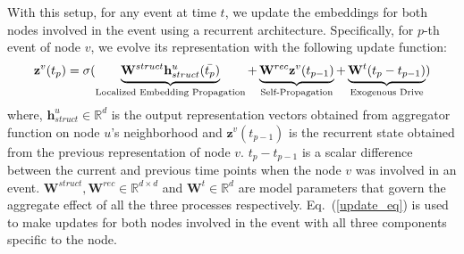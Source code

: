 \documentclass[11pt]{article}
\newcommand{\RT}[1]{{\color{blue} [Rakshit: #1]}}
\begin{document}
With this setup, for any event at time $t$, we update the embeddings for both nodes involved in the event using a recurrent architecture. Specifically, for $p$-th event of node $v$, we evolve its representation with the following update function:
\begin{equation}\label{update_eq}
\vspace{-1mm}
\mathbf{z}^v(t_p) = \sigma(\underbrace{\mathbf{W}^{struct} \mathbf{h}^u_{struct}(\bar{t_p})}_\text{Localized Embedding Propagation}+ \underbrace{\mathbf{W}^{rec}\mathbf{z}^v(t_{p-1})}_\text{Self-Propagation} + \underbrace{\mathbf{W}^{t}(t_p-t_{p-1})}_\text{Exogenous Drive})
\vspace{-1mm}
\end{equation}
where, $\mathbf{h}^u_{struct} \in \mathbb{R}^d$ is the output representation vectors obtained from aggregator function on node $u$'s neighborhood and $\mathbf{z}^v(t_{p-1})$ is the recurrent state obtained from the previous representation of node $v$. $t_p - t_{p-1}$ is a scalar difference between the current and previous time points when the node $v$ was involved in an event. $\mathbf{W}^{struct}, \mathbf{W}^{rec} \in \mathbb{R}^{d \times d}$ and $\mathbf{W}^{t} \in \mathbb{R}^d$ are model parameters that govern the aggregate effect of all the three processes respectively. Eq.~(\ref{update_eq}) is used to make updates for both nodes involved in the event with all three components specific to the node. 
\vspace{-2mm}
\end{document}
